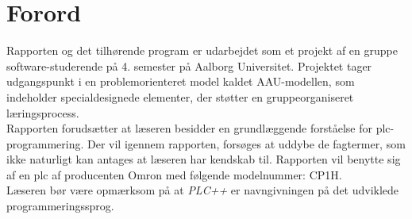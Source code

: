 \section*{Forord}
\label{sec:forord}
Rapporten og det tilhørende program er udarbejdet som et projekt af en gruppe software-studerende på 4. semester på Aalborg Universitet. Projektet tager udgangspunkt i en problemorienteret model kaldet AAU-modellen, som indeholder specialdesignede elementer, der støtter en gruppeorganiseret læringsprocess. \\

\noindent Rapporten forudsætter at læseren besidder en grundlæggende forståelse for \gls{plc}-programmering. Der vil igennem rapporten, forsøges at uddybe de fagtermer, som ikke naturligt kan antages at læseren har kendskab til. Rapporten vil benytte sig af en \gls{plc} af producenten Omron med følgende modelnummer: CP1H. \\

\noindent Læseren bør være opmærksom på at \textit{PLC++} er navngivningen på det udviklede programmeringssprog.